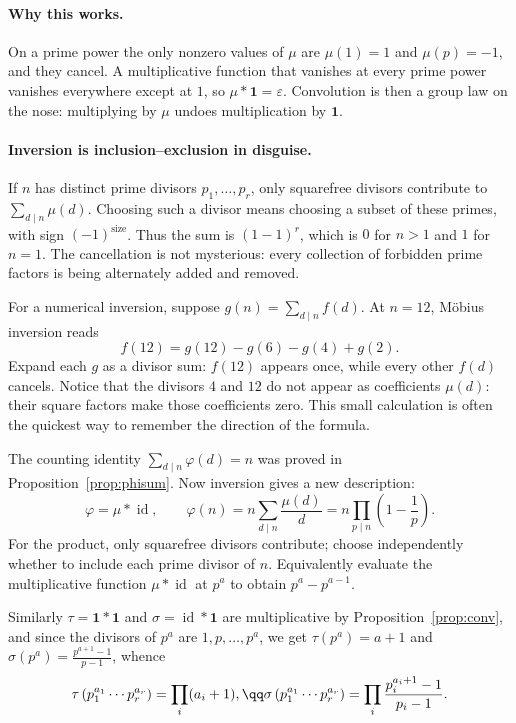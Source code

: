 \paragraph{Why this works.}
On a prime power the only nonzero values of $\mu$ are $\mu(1)=1$ and $\mu(p)=-1$, and they cancel. A multiplicative function that vanishes at every prime power vanishes everywhere except at $1$, so $\mu*\mathbf 1=\varepsilon$. Convolution is then a group law on the nose: multiplying by $\mu$ undoes multiplication by $\mathbf 1$.

\paragraph{Inversion is inclusion--exclusion in disguise.}
If $n$ has distinct prime divisors $p_1,\dots,p_r$, only squarefree divisors
contribute to $\sum_{d\mid n}\mu(d)$. Choosing such a divisor means choosing
a subset of these primes, with sign $(-1)^{\text{size}}$. Thus the sum is
$(1-1)^r$, which is $0$ for $n>1$ and $1$ for $n=1$.
The cancellation is not mysterious: every collection of forbidden prime factors
is being alternately added and removed.

For a numerical inversion, suppose $g(n)=\sum_{d\mid n}f(d)$. At $n=12$,
M\"obius inversion reads
\[
 f(12)=g(12)-g(6)-g(4)+g(2).
\]
Expand each $g$ as a divisor sum: $f(12)$ appears once, while every other
$f(d)$ cancels. Notice that the divisors $4$ and $12$ do not appear as
coefficients $\mu(d)$: their square factors make those coefficients zero.
This small calculation is often the quickest way to remember the direction of
the formula.

The counting identity $\sum_{d\mid n}\varphi(d)=n$ was proved in
Proposition~\ref{prop:phisum}. Now inversion gives a new description:
\[
\varphi=\mu*\operatorname{id},\qquad
\varphi(n)=n\sum_{d\mid n}\frac{\mu(d)}d
=n\prod_{p\mid n}\left(1-\frac1p\right).
\]
For the product, only squarefree divisors contribute; choose independently
whether to include each prime divisor of $n$. Equivalently evaluate the
multiplicative function $\mu*\operatorname{id}$ at $p^a$ to obtain
$p^a-p^{a-1}$.


Similarly $\tau=\mathbf 1*\mathbf 1$ and $\sigma=\operatorname{id}*\mathbf 1$ are multiplicative by Proposition~\ref{prop:conv}, and since the divisors of $p^a$ are $1,p,\dots,p^a$, we get $\tau(p^a)=a+1$ and $\sigma(p^a)=\frac{p^{a+1}-1}{p-1}$, whence
\[
\begin{gathered}\tau\left(p_1^{a_1}\cdots p_r^{a_r}\right)=\prod_i(a_i+1),\qq\sigma\left(p_1^{a_1}\cdots p_r^{a_r}\right)=\prod_i\frac{p_i^{a_i+1}-1}{p_i-1}.\end{gathered}
\]

